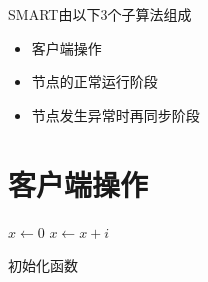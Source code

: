 \documentclass[a4paper,10pt]{article}
\title{\SMR}
\author{Sammy}
\date{2018-07-14}
\newcommand{\SMR}{SM{\footnotesize A}R{\footnotesize T}}
\begin{document}
\maketitle
\tableofcontents

\SMR 由以下3个子算法组成
\begin{itemize}
  \item 客户端操作
  \item 节点的正常运行阶段
  \item 节点发生异常时再同步阶段
\end{itemize}

\section{客户端操作}

\begin{algorithm}
  \DontPrintSemicolon

  \BlankLine
  \(x\leftarrow 0\)\;
   {
    \(x\leftarrow x+i\)\;
  }
  \caption{初始化函数}
\end{algorithm}
\end{document}
